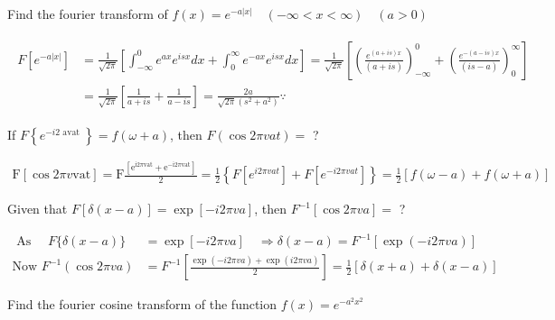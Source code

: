 \begin{exercise}
	Find the fourier transform of $f(x)=e^{-a|x|} \quad(-\infty<x<\infty) \quad(a>0)$
\end{exercise}
\begin{answer}
	\begin{align*}
	\begin{aligned}
	F\left[e^{-a|x|}\right] &=\frac{1}{\sqrt{2 \pi}}\left[\int_{-\infty}^{0} e^{a x} e^{i s x} d x+\int_{0}^{\infty} e^{-a x} e^{i s x} d x\right]=\frac{1}{\sqrt{2 \pi}}\left[\left(\frac{e^{(a+i s) x}}{(a+i s)}\right)_{-\infty}^{0}+\left(\frac{e^{-(a-i s) x}}{(i s-a)}\right)_{0}^{\infty}\right] \\
	&=\frac{1}{\sqrt{2 \pi}}\left[\frac{1}{a+i s}+\frac{1}{a-i s}\right]=\frac{2 a}{\sqrt{2 \pi}\left(s^{2}+a^{2}\right)} \because
	\end{aligned}
	\end{align*}
\end{answer}
\begin{exercise}
	If $F\left\{e^{-i 2 \text { avat }}\right\}=f(\omega+a)$, then $F(\cos 2 \pi v a t)=$ ?
\end{exercise}
\begin{answer}
	\begin{align*}
	\mathrm{F}[\cos 2 \pi v \mathrm{vat}]=\mathrm{F} \frac{\left[\mathrm{e}^{\mathrm{i} 2 \pi \mathrm{vat}}+\mathrm{e}^{-\mathrm{i} 2 \pi \mathrm{vat}}\right]}{2}=\frac{1}{2}\left\{F\left[e^{i 2 \pi v a t}\right]+F\left[e^{-i 2 \pi v a t}\right]\right\}=\frac{1}{2}[f(\omega-a)+f(\omega+a)]
	\end{align*}
\end{answer}
\begin{exercise}
	Given that $F[\delta(x-a)]=\exp [-i 2 \pi v a]$, then $F^{-1}[\cos 2 \pi v a]=$ ?
\end{exercise}
\begin{answer}
	\begin{align*}
\text{	As }\quad F\{\delta(x-a)\}&=\exp [-i 2 \pi v a] \quad \Rightarrow \delta(x-a)=F^{-1}[\exp (-i 2 \pi v a)]\\
	\text{Now }F^{-1}(\cos 2 \pi v a)&=F^{-1}\left[\frac{\exp (-i 2 \pi v a)+\exp (i 2 \pi v a)}{2}\right]=\frac{1}{2}[\delta(x+a)+\delta(x-a)]
	\end{align*}
\end{answer}
\begin{exercise}
	Find the fourier cosine transform of the function $f(x)=e^{-a^{2} x^{2}}$
\end{exercise}
